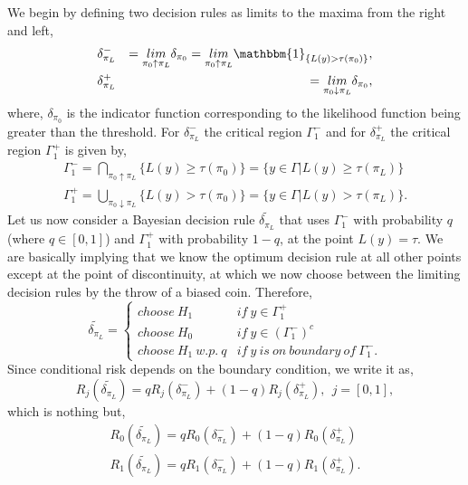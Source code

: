 \documentclass[a4paper,english,12pt]{article}
\begin{document}
We begin by defining two decision rules as limits to the maxima from the right and left, 
\begin{eqnarray}
&\delta_{\pi_{L}}^{-}& = \underset{\pi_0 \uparrow \pi_L}{lim} \delta_{\pi_0} = \underset{\pi_0 \uparrow \pi_L}{lim} \mathbbm{1}_{\{L(y) > \tau (\pi_0)\}}, \nonumber \\
&\delta_{\pi_{L}}^{+}& = \underset{\pi_0 \downarrow \pi_L}{lim} \delta_{\pi_0},
\end{eqnarray}
where, $\delta_{\pi_0}$ is the indicator function corresponding to the likelihood function being greater than the threshold. For $\delta_{\pi_{L}}^{-}$ the critical region $\Gamma_{1}^{-}$ and for $\delta_{\pi_{L}}^{+}$ the critical region $\Gamma_{1}^{+}$ is given by,
\begin{eqnarray}
\Gamma_{1}^{-} = \underset{\pi_0 \uparrow \pi_L}{\bigcap} \{ L(y) \geq \tau(\pi_0)\} = \{ y \in \Gamma | L(y) \geq \tau (\pi_L) \} \nonumber \\
\Gamma_{1}^{+} = \underset{\pi_0 \downarrow \pi_L}{\bigcup} \{ L(y) > \tau(\pi_0)\} = \{ y \in \Gamma | L(y) > \tau (\pi_L) \}.
\end{eqnarray}
Let us now consider a Bayesian decision rule $\tilde{\delta_{\pi_L}}$ that uses $\Gamma_1^{-}$ with probability $q$ (where $q \in [0,1]$) and $\Gamma_1^{+}$ with probability $1-q$, at the point $L(y) = \tau$. We are basically implying that we know the optimum decision rule at all other points except at the point of discontinuity, at which we now choose between the limiting decision rules by the throw of a biased coin. Therefore,
\begin{equation}
\tilde{\delta_{\pi_L}}  = 
\begin{cases}
choose~ H_1 &if~y \in \Gamma_1^{+}\\
choose~ H_0 &if~y \in {(\Gamma_1^{-})}^c\\
choose~ H_1 ~w.p.~ q &if~y~ is~ on~ boundary~ of~ \Gamma_1^{-}.
\end{cases}
\end{equation}
Since conditional risk depends on the boundary condition, we write it as,
\begin{equation}
R_j(\tilde{\delta_{\pi_L}}) = qR_j(\delta_{\pi_L}^{-}) + (1-q)R_j(\delta_{\pi_L}^{+}),~~j=[0,1], 
\end{equation}
which is nothing but,
\begin{eqnarray}
R_0(\tilde{\delta_{\pi_L}}) = qR_0(\delta_{\pi_L}^{-}) + (1-q)R_0(\delta_{\pi_L}^{+}) \nonumber \\
R_1(\tilde{\delta_{\pi_L}}) = qR_1(\delta_{\pi_L}^{-}) + (1-q)R_1(\delta_{\pi_L}^{+}). 
\end{eqnarray}
\end{document}
